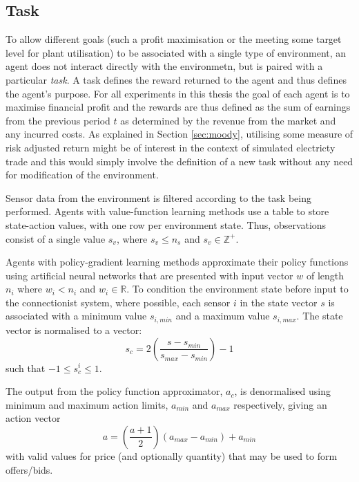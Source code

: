 \subsection{Task}
To allow different goals (such a profit maximisation or the
meeting some target level for plant utilisation) to be associated with a single
type of environment, an agent does not interact directly with the environmetn,
but is paired with a particular \textit{task}. A task defines the
reward returned to the agent and thus defines the agent's purpose.  For all
experiments in this thesis the goal of each agent is to maximise
financial profit and the rewards are thus defined as the sum of earnings from
the previous period $t$ as determined by the revenue from the market and any
incurred costs.  As explained in Section \ref{sec:moody}, utilising some
measure of risk adjusted return might be of interest in the context of
simulated electricty trade and this would simply involve the definition of a
new task without any need for modification of the environment.

Sensor data from the environment is filtered according to the task
being performed.  Agents with value-function learning methods use a table to
store state-action values, with one row per environment state.  Thus, observations
consist of a single value $s_v$, where $s_v \leq n_s$ and $s_v \in
\mathbb{Z}^+$.

Agents with policy-gradient learning methods approximate their policy
functions using artificial neural networks that are presented with input vector
$w$ of length $n_i$ where $w_i < n_i$ and $w_i \in \mathbb{R}$.  To condition
the environment state before input to the connectionist system, where possible,
each sensor $i$ in the state vector $s$ is associated with a minimum value
$s_{i,min}$ and a maximum value $s_{i,max}$.   The state vector is normalised
to a vector:
\begin{equation}
s_c = 2\left(\frac{s - s_{min}}{s_{max} - s_{min}}\right) - 1
\end{equation}
such that $-1 \leq s_c^i \leq 1$.

The output from the policy function approximator, $a_c$, is denormalised using
minimum and maximum action limits, $a_{min}$ and $a_{max}$ respectively, giving
an action vector
\begin{equation}
a = \left(\frac{a + 1}{2}\right)(a_{max} - a_{min}) + a_{min}
\end{equation}
with valid values for price (and optionally quantity) that may be used to form
offers/bids.

